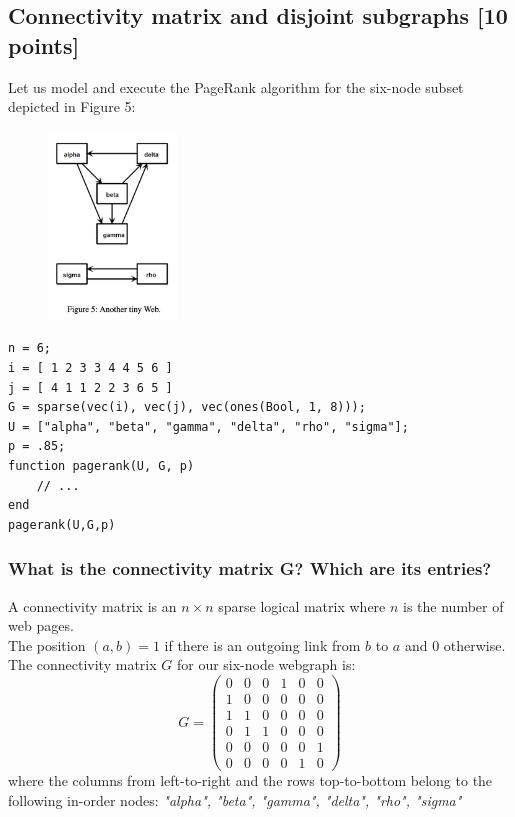 \documentclass[unicode,11pt,a4paper,oneside,numbers=endperiod,openany]{scrartcl}
\begin{document}
\subsection{Connectivity matrix and disjoint subgraphs [10 points]}
Let us model and execute the PageRank algorithm for the six-node subset depicted in Figure 5:
\begin{figure}[h!]
    \centering
    \includegraphics[height=5cm]{fig/fig5.png}
    \label{fig:tinyWeb}
\end{figure}

\begin{verbatim}
n = 6;
i = [ 1 2 3 3 4 4 5 6 ]
j = [ 4 1 1 2 2 3 6 5 ]
G = sparse(vec(i), vec(j), vec(ones(Bool, 1, 8)));
U = ["alpha", "beta", "gamma", "delta", "rho", "sigma"];
p = .85;
function pagerank(U, G, p)
    // ...
end
pagerank(U,G,p)
\end{verbatim}


\subsubsection{What is the connectivity matrix G? Which are its entries?}
A connectivity matrix is an $n\times n$ sparse logical matrix where $n$ is the number of web pages. \\
The position $(a,b) = 1$ if there is an outgoing link from $b$ to $a$ and $0$ otherwise.\\
The connectivity matrix $G$ for our six-node webgraph is:\\
$$ G = 
\begin{pmatrix}
0 & 0 & 0 & 1 & 0 & 0\\1 & 0 & 0 & 0 & 0 & 0\\1 & 1 & 0 & 0 & 0 & 0\\0 & 1 & 1 & 0 & 0 & 0\\0 & 0 & 0 & 0 & 0 & 1\\0 & 0 & 0 & 0 & 1 & 0
\end{pmatrix}
$$
where the columns from left-to-right and the rows top-to-bottom belong to the following in-order nodes: \textit{"alpha", "beta", "gamma", "delta", "rho", "sigma"}
\end{document}

